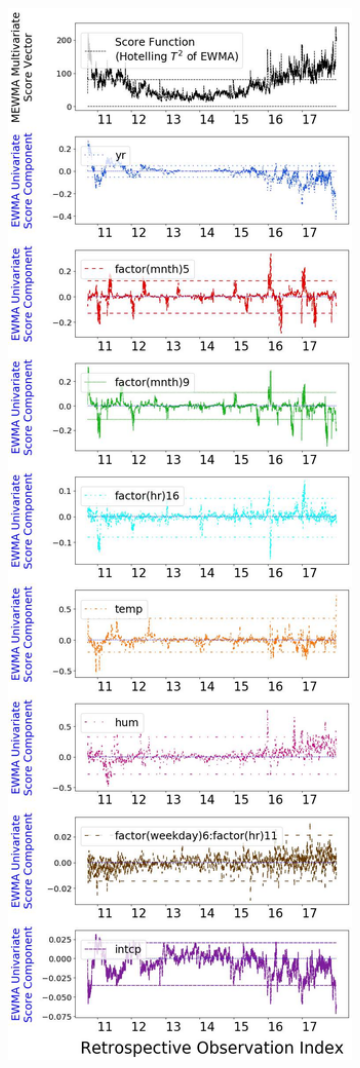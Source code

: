 \documentclass[twoside,11pt]{article}
\begin{document}
\begin{figure}[H]
\begin{subfigure}[t]{0.35\linewidth}
     \captionsetup{width=.95\linewidth}
     \caption{}
     \label{fig:bs_retro}
\end{subfigure}
\begin{subfigure}[t]{0.35\linewidth}
     \centering
         \includegraphics[width=1.0\textwidth, trim=.0in .0in .0in .0in, clip]{../figures/v14/bike_sharing/reg_lin_B_1/quadr/Compressed_PII_pos_single_retro_bike_fisher_mlines_with_regu_1e-08_0_0001_0_01_99_99.png}

\end{subfigure}
\end{figure}
\end{document}
